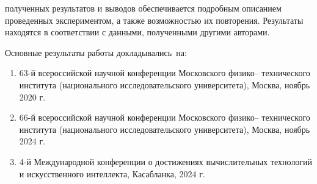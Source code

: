 {\reliability} полученных результатов и выводов обеспечивается подробным описанием проведенных экспериментом, а также возможностью их повторения. Результаты находятся в соответствии с данными, полученными другими авторами.


{\probation}
Основные результаты работы докладывались~на:
\begin{enumerate}[beginpenalty=10000] %
	\item 63-й всероссийской научной конференции Московского физико–
	технического института (национального исследовательского университета), Москва,
	ноябрь 2020 г.
	\item 66-й всероссийской научной конференции Московского физико–
	технического института (национального исследовательского университета), Москва,
	ноябрь 2024 г.
	\item 4-й Международной конференции о достижениях вычислительных технологий и искусственного интеллекта, Касабланка, 2024 г.
\end{enumerate}

